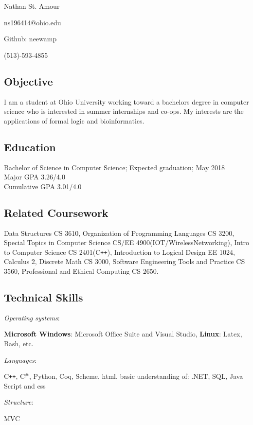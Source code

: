 \documentclass[11pt]{article} %
\newcommand{\name}[1]{
  \centerline{\Huge{#1}}
  }
\begin{document}
\thispagestyle{empty}
\name{Nathan St. Amour}
\begin{center}

 
 
\centerline{\large{ns196414@ohio.edu}}
\centerline{Github: neewamp}
\centerline{\large{(513)-593-4855}}

\end{center}
 \subsection*{Objective}
 I am a student at Ohio University working toward a bachelors degree in computer science who is interested in summer internships and co-ops.  My  interests are the applications of formal logic and bioinformatics.
  \subsection*{Education}
  Bachelor of Science in Computer Science; Expected graduation; May 2018\\
  Major GPA    3.26/4.0 \\
Cumulative GPA   3.01/4.0


\subsection*{Related Coursework}
Data Structures CS 3610, Organization of Programming Languages CS 3200, Special Topics in Computer Science CS/EE 4900(IOT/WirelessNetworking), Intro to Computer Science CS 2401(C\texttt{++}), Introduction to Logical Design EE 1024, Calculus 2, Discrete Math CS 3000, Software Engineering Tools and Practice CS 3560, Professional and Ethical Computing CS 2650.
\subsection*{Technical Skills}


\begin{bf}\emph {Operating systems}:\end{bf}\textbf { Microsoft Windows}: Microsoft Office Suite and Visual Studio, \textbf{Linux}:  Latex, Bash,  etc.\\
\begin{bf}\emph {Languages}:\end{bf} C\texttt{++}, C$^\texttt{\#}$, Python, Coq, Scheme,  html, basic understanding of: .NET, SQL, Java Script and css  \\ 
\begin{bf}\emph {Structure}:\end{bf} MVC
\end{document}
